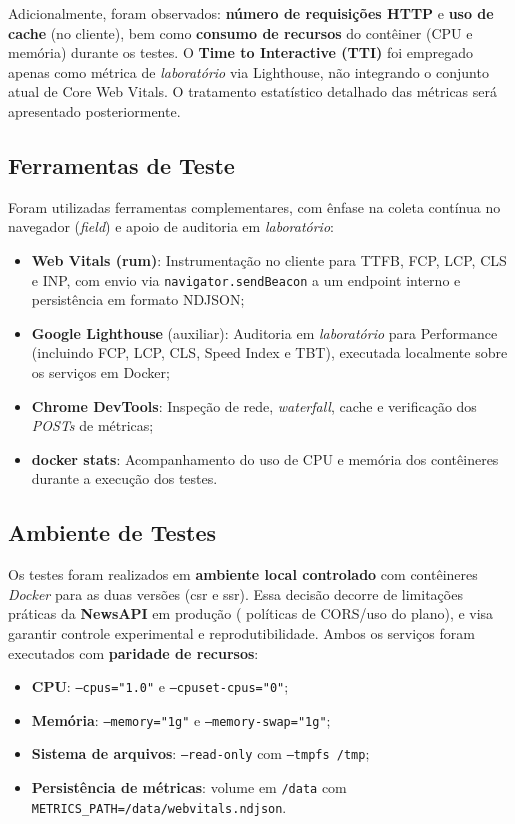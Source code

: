 \noindent
Adicionalmente, foram observados: \textbf{número de requisições HTTP} e \textbf{uso de cache} (no cliente), bem como \textbf{consumo de recursos} do contêiner (CPU e memória) durante os testes. O \textbf{Time to Interactive (TTI)} foi empregado apenas como métrica de \textit{laboratório} via Lighthouse, não integrando o conjunto atual de Core Web Vitals. O tratamento estatístico detalhado das métricas será apresentado posteriormente.

\subsection{Ferramentas de Teste}

Foram utilizadas ferramentas complementares, com ênfase na coleta contínua no navegador (\textit{field}) e apoio de auditoria em \textit{laboratório}:

\begin{itemize}
    \item \textbf{Web Vitals (\acrfull{rum})}: Instrumentação no cliente para TTFB, FCP, LCP, CLS e INP, com envio via \texttt{navigator.sendBeacon} a um endpoint interno e persistência em formato NDJSON;
    \item \textbf{Google Lighthouse} (auxiliar): Auditoria em \textit{laboratório} para Performance (incluindo FCP, LCP, CLS, Speed Index e TBT), executada localmente sobre os serviços em Docker;
    \item \textbf{Chrome DevTools}: Inspeção de rede, \textit{waterfall}, cache e verificação dos \textit{POSTs} de métricas;
    \item \textbf{docker stats}: Acompanhamento do uso de CPU e memória dos contêineres durante a execução dos testes.
\end{itemize}

\subsection{Ambiente de Testes}

Os testes foram realizados em \textbf{ambiente local controlado} com contêineres \textit{Docker} para as duas versões (\acrshort{csr} e \acrshort{ssr}). Essa decisão decorre de limitações práticas da \textbf{NewsAPI} em produção ( políticas de CORS/uso do plano), e visa garantir controle experimental e reprodutibilidade. Ambos os serviços foram executados com \textbf{paridade de recursos}:

\begin{itemize}
    \item \textbf{CPU}: \texttt{--cpus="1.0"} e \texttt{--cpuset-cpus="0"};
    \item \textbf{Memória}: \texttt{--memory="1g"} e \texttt{--memory-swap="1g"};
    \item \textbf{Sistema de arquivos}: \texttt{--read-only} com \texttt{--tmpfs /tmp};
    \item \textbf{Persistência de métricas}: volume em \texttt{/data} com \texttt{METRICS\_PATH=/data/webvitals.ndjson}.
\end{itemize}

